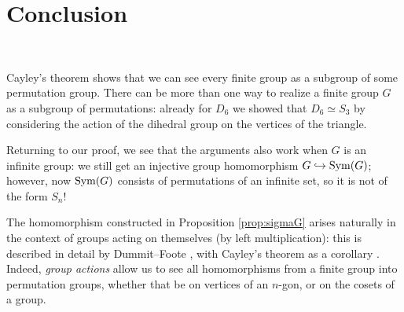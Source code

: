 \section{Conclusion}~\label{sec:conc}

\begin{Answer}
  Cayley's theorem shows that we can see every finite group as a subgroup of some permutation 
  group.  There can be more than one way to realize a finite group $G$ as a subgroup of 
  permutations: already for $D_6$ we showed that $D_6 \simeq S_3$ by considering the action of 
  the dihedral group on the vertices of the triangle.  
  
  Returning to our proof, we see that the arguments also work when $G$ is an infinite group: we 
  still get an injective group homomorphism $G \hookrightarrow \operatorname{Sym}(G)$; however, now $\operatorname{Sym}(G)$ 
  consists of permutations of an infinite set, so it is not of the form $S_n$!  
  
  The homomorphism constructed in Proposition \ref{prop:sigmaG} arises naturally in the context
  of groups acting on themselves (by left multiplication): this is described in detail by 
  Dummit--Foote \cite[\S 4.2]{DummitFoote}, with Cayley's theorem as a corollary \cite[\S 4.2, 
  Corollary 4, p.~120]{DummitFoote}.  Indeed, \emph{group actions} allow us to see all 
  homomorphisms from a finite group into permutation groups, whether that be on vertices of an 
  $n$-gon, or on the cosets of a group.
\end{Answer}

